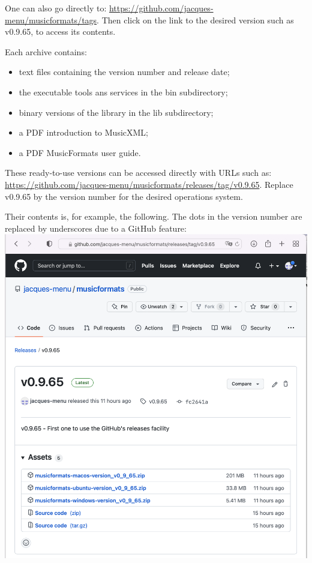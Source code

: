 One can also go directly to:
\url{https://github.com/jacques-menu/musicformats/tags}.
Then click on the link to the desired version such as v0.9.65, to access its contents.

Each  archive contains:
\begin{itemize}
\item  text files containing the version number and release date;
\item  the executable tools ans services in the bin subdirectory;
\item  binary versions of the library in the lib subdirectory;
\item  a PDF introduction to MusicXML;
\item  a PDF MusicFormats user guide.
\end{itemize}

These ready-to-use versions can be accessed directly with URLs such as:
\url{https://github.com/jacques-menu/musicformats/releases/tag/v0.9.65}.
Replace v0.9.65 by the version number for the desired operations system.

Their contents is, for example, the following. The dots in the version number are replaced by underscores due to a GitHub feature:\\
\includegraphics[scale=0.5]{../graphics/ReadyToUseVersionContents.png}

